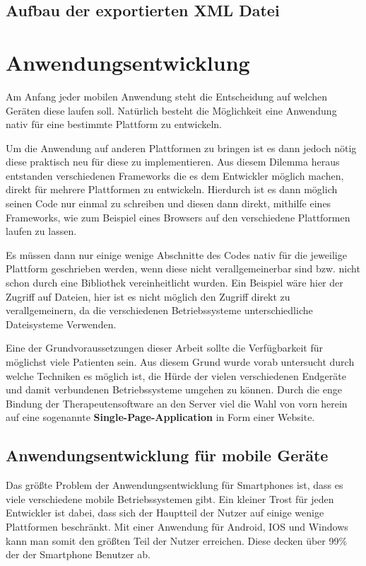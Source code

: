 \subsection{Aufbau der exportierten XML Datei}
 
 

\section{Anwendungsentwicklung} 
Am Anfang jeder mobilen Anwendung steht die Entscheidung auf welchen Geräten diese laufen soll. Natürlich besteht die Möglichkeit eine Anwendung nativ für eine bestimmte Plattform zu entwickeln.

Um die Anwendung auf anderen Plattformen zu bringen ist es dann jedoch nötig diese praktisch neu für diese zu implementieren. Aus diesem Dilemma heraus entstanden verschiedenen Frameworks die es dem Entwickler möglich machen, direkt für mehrere Plattformen zu entwickeln. Hierdurch ist es dann möglich seinen Code nur einmal zu schreiben und diesen dann direkt, mithilfe eines Frameworks, wie zum Beispiel eines Browsers auf den verschiedene Plattformen laufen zu lassen.

Es müssen dann nur einige wenige Abschnitte des Codes nativ für die jeweilige Plattform geschrieben werden, wenn diese nicht verallgemeinerbar sind bzw. nicht schon durch eine Bibliothek vereinheitlicht wurden. Ein Beispiel wäre hier der Zugriff auf Dateien, hier ist es nicht möglich den Zugriff direkt zu verallgemeinern, da die verschiedenen Betriebssysteme unterschiedliche Dateisysteme Verwenden.

Eine der Grundvoraussetzungen dieser Arbeit sollte die Verfügbarkeit für möglichst viele Patienten sein. Aus diesem Grund wurde vorab untersucht durch welche Techniken es möglich ist, die Hürde der vielen verschiedenen Endgeräte und damit verbundenen Betriebssysteme umgehen zu können. Durch die enge Bindung der Therapeutensoftware an den Server viel die Wahl von vorn herein auf eine sogenannte \textbf{Single-Page-Application} in Form einer Website.


\subsection{Anwendungsentwicklung für mobile Geräte}
Das größte Problem der Anwendungsentwicklung für Smartphones ist, dass es viele verschiedene mobile Betriebssystemen gibt. Ein kleiner Trost für jeden Entwickler ist dabei, dass sich der Hauptteil der Nutzer auf einige wenige Plattformen beschränkt. Mit einer Anwendung für Android, IOS und Windows kann man somit den größten Teil der Nutzer erreichen. Diese decken über 99\% \cite{STA2016} der der Smartphone Benutzer ab.



